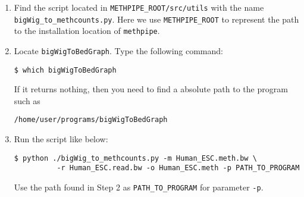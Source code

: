 \documentclass[10pt]{article}
\newcommand{\meth}{\texttt{methpipe}}
\newcommand{\prog}[1]{\texttt{#1}}
\newcommand{\fn}[1]{\texttt{#1}}
\newcommand{\lit}[1]{\texttt{#1}}
\begin{document}
\begin{enumerate}
\item Find the script located in \texttt{METHPIPE\_ROOT/src/utils} with the
name \texttt{bigWig\_to\_methcounts.py}. Here we use
\texttt{METHPIPE\_ROOT} to represent the path to the installation location
of \meth.
\item Locate \texttt{bigWigToBedGraph}. Type the following command:
\begin{verbatim}
$ which bigWigToBedGraph
\end{verbatim}
If it returns nothing, then you need to find a absolute path to the 
program such as
\begin{verbatim}
/home/user/programs/bigWigToBedGraph
\end{verbatim}
\item Run the script like below:
\begin{verbatim}
$ python ./bigWig_to_methcounts.py -m Human_ESC.meth.bw \
          -r Human_ESC.read.bw -o Human_ESC.meth -p PATH_TO_PROGRAM
\end{verbatim}
Use the path found in Step 2 as \texttt{PATH\_TO\_PROGRAM} for parameter
\texttt{-p}.

\end{enumerate}


\end{document}
